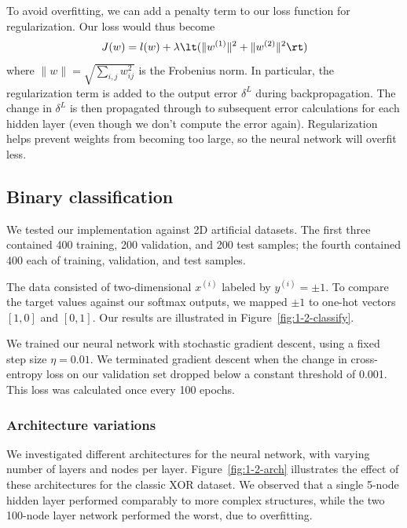 \documentclass{article}
\newcommand{\sind}[1]{^{(#1)}}
\begin{document}
\begin{multicols}{2}
To avoid overfitting, we can add a penalty term to our loss function for regularization.
Our loss would thus become
\begin{equation}
    J(w) = l(w) +
      \lambda
        \lt(\lVert w^{(1)} \rVert^2 + \lVert w^{(2)} \rVert^2\rt)
\end{equation}
where $\lVert w\rVert = \sqrt{\sum_{i,j}{w_{ij}^2}}$ is the Frobenius norm.
In particular,
the regularization term is added to the output error $\delta^L$
during backpropagation.
The change in $\delta^L$ is then propagated
through to subsequent error calculations for each hidden layer
(even though we don't compute the error again).
Regularization helps prevent weights from becoming too large,
so the neural network will overfit less.

\subsection{Binary classification}
\label{subsubsec:binary}

We tested our implementation against 2D artificial datasets.
The first three contained
400 training,
200 validation,
and 200 test samples;
the fourth contained
400 each of training, validation, and test samples.

The data consisted of two-dimensional $x\sind{i}$
labeled by $y\sind{i} = \pm1$.
To compare the target values against our softmax outputs,
we mapped $\pm1$ to one-hot vectors $[1,0]$ and $[0,1]$.
Our results are illustrated in Figure~\ref{fig:1-2-classify}.

We trained our neural network with stochastic gradient descent,
using a fixed step size $\eta = 0.01$.
We terminated gradient descent when
the change in cross-entropy loss on our validation set
dropped below a constant threshold of 0.001.
This loss was calculated once every 100 epochs.

\subsubsection{Architecture variations}
\label{subsubsec:binaryarch}

We investigated different architectures for the neural network,
with varying number of layers and nodes per layer.
Figure~\ref{fig:1-2-arch} illustrates the effect
of these architectures for the classic XOR dataset.
We observed that a single 5-node hidden layer
performed comparably to more complex structures,
while the two 100-node layer network performed the worst,
due to overfitting.


\end{multicols}
\end{document}
